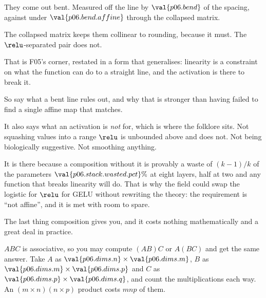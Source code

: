 \begin{fr}
\begin{ansblock}
They come out bent. Measured off the line by
$\val{p06.bend}$ of the spacing, against under $\val{p06.bend.affine}$ through
the collapsed matrix.
\end{ansblock}

The collapsed matrix keeps them collinear to rounding, because it must. The
$\relu$-separated pair does not.

That is F05's corner, restated in a form that generalises: linearity is a
constraint on what the function can do to a straight line, and the activation
is there to break it.

So say what a bent line rules out, and why that is stronger than having failed
to find a single affine map that matches.
\dotline
\nextframe
\end{fr}

\begin{fr}
\begin{aibox}
It also says what an activation is \emph{not} for, which is where the folklore
sits. Not squashing values into a range \dash{} $\relu$ is unbounded above and
does not. Not being biologically suggestive. Not smoothing anything.

It is there because a composition without it is provably a waste of $(k-1)/k$
of the parameters \dash{} $\val{p06.stack.wasted.pct}\%$ at eight layers, half
at two \dash{} and any function that breaks linearity will do. That is why the
field could swap the logistic for $\relu$
for GELU without rewriting the theory: the requirement is
\enquote{not affine}, and it is met with room to spare.
\end{aibox}
\end{fr}

\begin{fr}
The last thing composition gives you, and it costs nothing mathematically and a
great deal in practice.

$ABC$ is associative, so you may compute $(AB)C$ or $A(BC)$ and get the same
answer. Take $A$ as $\val{p06.dims.n} \times \val{p06.dims.m}$, $B$ as
$\val{p06.dims.m} \times \val{p06.dims.p}$ and $C$ as
$\val{p06.dims.p} \times \val{p06.dims.q}$, and count the multiplications each
way. An $(m \times n)(n \times p)$ product costs $mnp$ of them.
\dotline
\nextframe
\end{fr}


